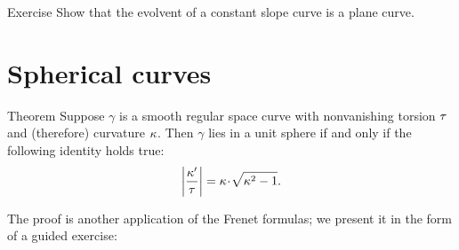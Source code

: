 \begin{thm}{Exercise}\label{ex:evolvent-constant-slope}
Show that the evolvent of a constant slope curve is a plane curve.
\end{thm}

\section{Spherical curves}

\begin{thm}{Theorem}
Suppose $\gamma$ is a smooth regular space curve with nonvanishing torsion $\tau$ and (therefore) curvature $\kappa$.
Then $\gamma$ lies in a unit sphere if and only if 
the following identity holds true:
\[\left|\frac{\kur'}{\tor}\right|=\kur\cdot\sqrt{\kur^2-1}.\]
\end{thm}

The proof is another application of the Frenet formulas;
we present it in the form of a guided exercise:

